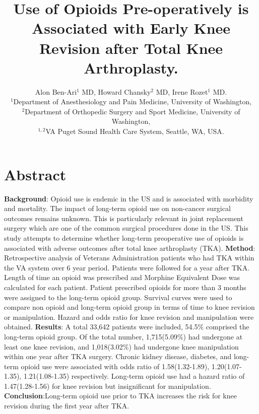 \documentclass[a4paper]{article}
\title{ Use of Opioids Pre-operatively is Associated with Early Knee Revision after Total Knee Arthroplasty.}
\author{
\large
{Alon Ben-Ari$^1$ MD, Howard Chansky$^2$ MD, Irene Rozet$^1$ MD}.\\
\small $^1$Department of Anesthesiology and Pain Medicine, University of Washington,\\
\small $^2$Department of Orthopedic Surgery and Sport Medicine, University of Washington,\\ \small $^{1,2}$VA Puget Sound Health Care System, Seattle, WA, USA. }
\date{}
\begin{document}

%
%

\maketitle
\newpage

\section*{Abstract} \normalsize
\textbf{Background}: Opioid use is endemic in the US and is associated with morbidity and mortality. The impact of long-term opioid use on non-cancer surgical outcomes remains unknown. This is particularly relevant in joint replacement surgery which are one of the common surgical procedures done in the US.
This study attempts to  determine whether long-term preoperative use of opioids is associated with adverse outcomes after total knee arthroplasty (TKA).\newline 
\textbf{Method}:  Retrospective analysis of Veterans Administration patients who had TKA within the VA system over 6 year period. Patients were followed for a year after TKA. Length of time an opioid was prescribed and Morphine Equivalent Dose  was calculated for each patient. Patient prescribed opioids for more than 3 months were assigned to the long-term opioid group. Survival curves were used to compare non opioid and long-term opioid group in terms of time to knee revision or manipulation. Hazard and odds ratio for knee revision and  manipulation were obtained. \newline
\textbf{Results}:  A total 33,642 patients were included, 54.5\% comprised the long-term opioid group. Of the total number, 1,715(5.09\%) had undergone at least one knee revision, and 1,018(3.02\%) had undergone knee manipulation within one year after TKA surgery. Chronic kidney disease, diabetes, and long-term opioid use were associated with odds ratio of 1.58(1.32-1.89), 1.20(1.07-1.35), 1.21(1.08-1.35) respectively. Long-term opioid use had a hazard ratio of 1.47(1.28-1.56) for knee revision but insignificant for manipulation.\newline
\textbf{Conclusion}:Long-term opioid use prior to TKA increases the risk for knee revision during the first year after TKA.\newpage
\end{document}
